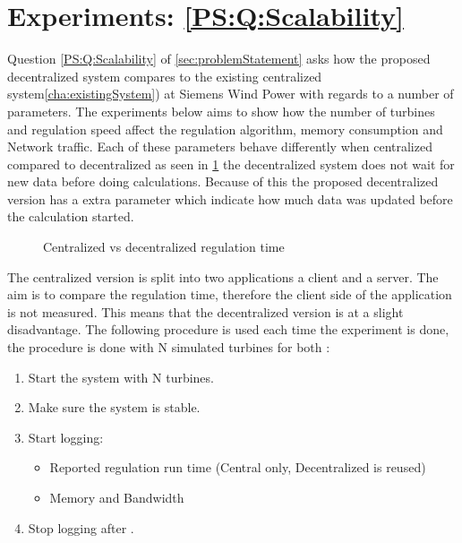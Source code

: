 \section{Experiments: \ref{PS:Q:Scalability}}
Question \ref{PS:Q:Scalability} of \cref{sec:problemStatement} asks how the proposed decentralized system compares to the existing centralized system\cref{cha:existingSystem}) at Siemens Wind Power with regards to a number of parameters.
The experiments below aims to show how the number of turbines and regulation speed affect the regulation algorithm, memory consumption and Network traffic.
Each of these parameters behave differently when centralized compared to decentralized as seen in \cref{fig:timingCentralVSDecentral} the decentralized system does not wait for new data before doing calculations. Because of this the proposed decentralized version has a extra parameter which indicate how much data was updated before the calculation started.

\begin{figure}[b]
	\centering
	{}
	\newline
	
	\newline
	
	{}
	
	\caption{Centralized vs decentralized regulation time}
	\label{fig:timingCentralVSDecentral}
\end{figure}

	The centralized version is split into two applications a client and a server.
	The aim is to compare the regulation time, therefore the client side of the application is not measured. This means that the decentralized version is at a slight disadvantage.
	The following procedure is used each time the experiment is done, the procedure is done with N simulated turbines for both :

\begin{minipage}{\textwidth}
	\begin{enumerate}
		\item Start the system with N turbines.
		\item Make sure the system is stable.
		\item Start logging:
		\begin{itemize}
			\item Reported regulation run time (Central only, Decentralized is reused)
			\item Memory and Bandwidth
		\end{itemize}
		\item Stop logging after \experiemntRunTime.
		\end{enumerate}
\end{minipage}
